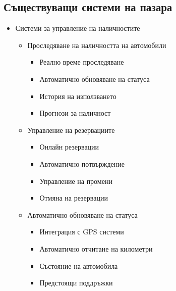 \documentclass[12pt,a4paper]{article}
\begin{document}
\subsection{Съществуващи системи на пазара}
\begin{itemize}
    \item Системи за управление на наличностите
    \begin{itemize}
        \item Проследяване на наличността на автомобили
        \begin{itemize}
            \item Реално време проследяване
            \item Автоматично обновяване на статуса
            \item История на използването
            \item Прогнози за наличност
        \end{itemize}
        \item Управление на резервациите
        \begin{itemize}
            \item Онлайн резервации
            \item Автоматично потвърждение
            \item Управление на промени
            \item Отмяна на резервации
        \end{itemize}
        \item Автоматично обновяване на статуса
        \begin{itemize}
            \item Интеграция с GPS системи
            \item Автоматично отчитане на километри
            \item Състояние на автомобила
            \item Предстоящи поддръжки
        \end{itemize}
    \end{itemize}
    

\end{itemize}
\end{document}
